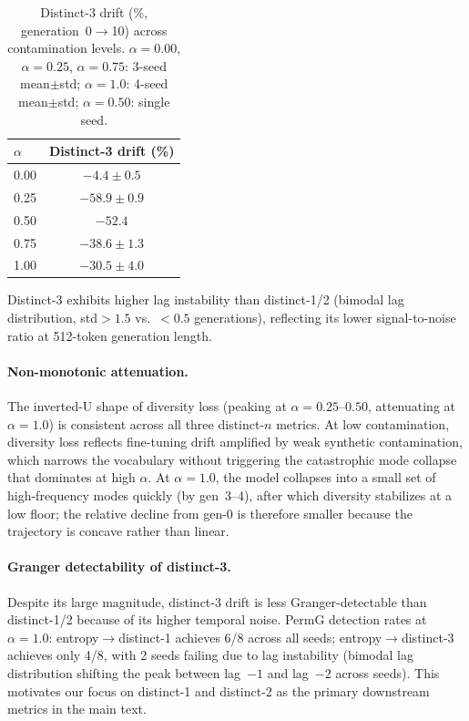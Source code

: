 \begin{table}[H]
\centering
\small
\caption{Distinct-3 drift (\%, generation~0$\to$10) across contamination levels. $\alpha{=}0.00$, $\alpha{=}0.25$, $\alpha{=}0.75$: 3-seed mean${\pm}$std; $\alpha{=}1.0$: 4-seed mean${\pm}$std; $\alpha{=}0.50$: single seed.}
\label{tab:distinct3_drift}
\begin{tabular}{lc}
\toprule
$\alpha$ & Distinct-3 drift (\%) \\
\midrule
0.00 & $-4.4{\pm}0.5$ \\
0.25 & $-58.9{\pm}0.9$ \\
0.50 & $-52.4$ \\
0.75 & $-38.6{\pm}1.3$ \\
1.00 & $-30.5{\pm}4.0$ \\
\bottomrule
\end{tabular}
\end{table}

Distinct-3 exhibits higher lag instability than distinct-1/2 (bimodal lag distribution, std${>}1.5$ vs.\ ${<}0.5$ generations), reflecting its lower signal-to-noise ratio at 512-token generation length.

\paragraph{Non-monotonic attenuation.}
The inverted-U shape of diversity loss (peaking at $\alpha{=}0.25$--$0.50$, attenuating at $\alpha{=}1.0$) is consistent across all three distinct-$n$ metrics.
At low contamination, diversity loss reflects fine-tuning drift amplified by weak synthetic contamination, which narrows the vocabulary without triggering the catastrophic mode collapse that dominates at high $\alpha$.
At $\alpha{=}1.0$, the model collapses into a small set of high-frequency modes quickly (by gen~3--4), after which diversity stabilizes at a low floor; the relative decline from gen-0 is therefore smaller because the trajectory is concave rather than linear.

\paragraph{Granger detectability of distinct-3.}
Despite its large magnitude, distinct-3 drift is less Granger-detectable than distinct-1/2 because of its higher temporal noise.
PermG detection rates at $\alpha{=}1.0$: entropy$\to$distinct-1 achieves 6/8 across all seeds; entropy$\to$distinct-3 achieves only 4/8, with 2 seeds failing due to lag instability (bimodal lag distribution shifting the peak between lag~$-1$ and lag~$-2$ across seeds).
This motivates our focus on distinct-1 and distinct-2 as the primary downstream metrics in the main text.


